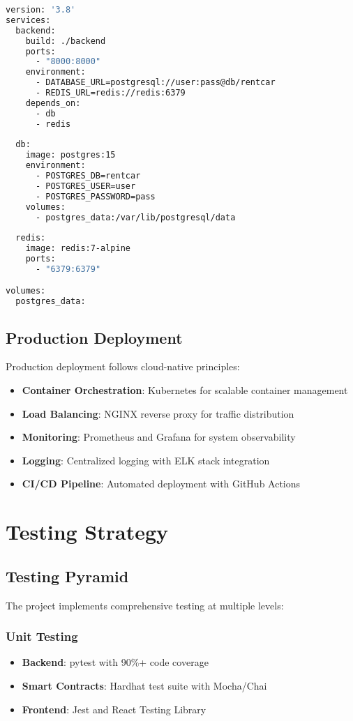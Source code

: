 \documentclass[12pt,a4paper]{article}
\begin{document}
\begin{lstlisting}[language=bash, caption=Docker Compose Configuration]
version: '3.8'
services:
  backend:
    build: ./backend
    ports:
      - "8000:8000"
    environment:
      - DATABASE_URL=postgresql://user:pass@db/rentcar
      - REDIS_URL=redis://redis:6379
    depends_on:
      - db
      - redis
  
  db:
    image: postgres:15
    environment:
      - POSTGRES_DB=rentcar
      - POSTGRES_USER=user
      - POSTGRES_PASSWORD=pass
    volumes:
      - postgres_data:/var/lib/postgresql/data
  
  redis:
    image: redis:7-alpine
    ports:
      - "6379:6379"

volumes:
  postgres_data:
\end{lstlisting}

\subsection{Production Deployment}
Production deployment follows cloud-native principles:

\begin{itemize}
    \item \textbf{Container Orchestration}: Kubernetes for scalable container management
    \item \textbf{Load Balancing}: NGINX reverse proxy for traffic distribution
    \item \textbf{Monitoring}: Prometheus and Grafana for system observability
    \item \textbf{Logging}: Centralized logging with ELK stack integration
    \item \textbf{CI/CD Pipeline}: Automated deployment with GitHub Actions
\end{itemize}

\section{Testing Strategy}

\subsection{Testing Pyramid}
The project implements comprehensive testing at multiple levels:

\subsubsection{Unit Testing}
\begin{itemize}
    \item \textbf{Backend}: pytest with 90\%+ code coverage
    \item \textbf{Smart Contracts}: Hardhat test suite with Mocha/Chai
    \item \textbf{Frontend}: Jest and React Testing Library
\end{itemize}
\end{document}
